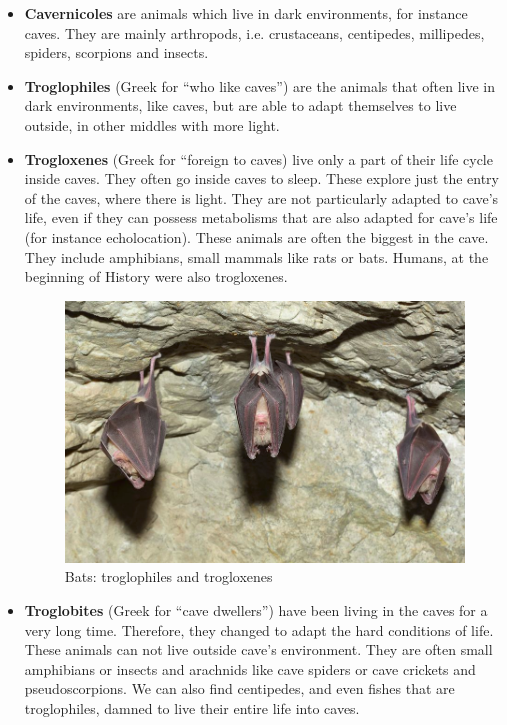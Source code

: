 \documentclass{article}
\begin{document}
\begin{itemize}[label=$\square$]

\item \textbf{Cavernicoles} are animals which live in dark environments, for instance caves. They are mainly arthropods, i.e. crustaceans, centipedes, millipedes, spiders, scorpions and insects.

\item \textbf{Troglophiles} (Greek for “who like caves”) are the animals that often live in dark environments, like caves, but are able to adapt themselves to live outside, in other middles with more light.

\item \textbf{Trogloxenes} (Greek for “foreign to caves) live only a part of their life cycle inside caves. They often go inside caves to sleep. These explore just the entry of the caves, where there is light. They are not particularly adapted to cave’s life, even if they can possess metabolisms that are also adapted for cave’s life (for instance echolocation). These animals are often the biggest in the cave. They include amphibians, small mammals like rats or bats. Humans, at the beginning of History were also trogloxenes.

\begin{figure}[!ht]
  \centering
  \includegraphics[scale=0.5]{Images/bats}
  \caption{Bats: troglophiles and trogloxenes \cite{BatsPresentation}}
\end{figure}

\item \textbf{Troglobites} (Greek for “cave dwellers”) have been living in the caves for a very long time. Therefore, they changed to adapt the hard conditions of life. These animals can not live outside cave’s environment. They are often small amphibians or insects and arachnids like cave spiders or cave crickets and pseudoscorpions. We can also find centipedes, and even fishes that are troglophiles, damned to live their entire life into caves.
\end{itemize}
\end{document}
